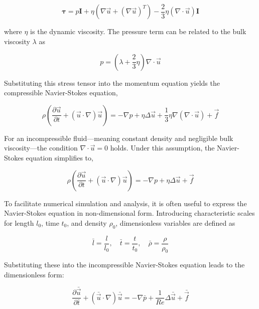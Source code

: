 \begin{equation}
    \boldsymbol{\tau} = p\mathbf{I} + \eta\left( \nabla \vec{u} + (\nabla \vec{u})^T \right) - \frac{2}{3}\eta(\nabla \cdot \vec{u})\mathbf{I}
\end{equation}

where $\eta$ is the dynamic viscosity. The pressure term can be related to the bulk viscosity $\lambda$ as

\begin{equation}
    p = \left( \lambda + \frac{2}{3}\eta \right) \nabla \cdot \vec{u}
\end{equation}

Substituting this stress tensor into the momentum equation yields the compressible Navier-Stokes equation,

\begin{equation}
    \rho \left(\frac{\partial\vec{u}}{\partial t} + (\vec{u}\cdot\nabla)\vec{u} \right) = -\nabla p + \eta \Delta \vec{u} + \frac{1}{3}\eta \nabla(\nabla \cdot \vec{u}) + \vec{f}
\end{equation}

For an incompressible fluid—meaning constant density and negligible bulk viscosity—the condition $\nabla \cdot \vec{u} = 0$ holds. Under this assumption, the Navier-Stokes equation simplifies to,

\begin{equation}
    \rho \left(\frac{\partial\vec{u}}{\partial t} + (\vec{u}\cdot\nabla)\vec{u} \right) = -\nabla p + \eta \Delta \vec{u} + \vec{f}
\end{equation}

To facilitate numerical simulation and analysis, it is often useful to express the Navier-Stokes equation in non-dimensional form. Introducing characteristic scales for length 
$l_0$, time $t_0$, and density $\rho_0$, dimensionless variables are defined as

\begin{equation}
    \bar{l} = \frac{l}{l_0}, \quad \bar{t} = \frac{t}{t_0}, \quad \bar{\rho} = \frac{\rho}{\rho_0}
\end{equation}

Substituting these into the incompressible Navier-Stokes equation leads to the dimensionless form:

\begin{equation}
    \frac{\partial \bar{\vec{u}}}{\partial \bar{t}} + (\bar{\vec{u}} \cdot\nabla)\bar{\vec{u}} = -\nabla \bar{p} + \frac{1}{Re} \Delta \bar{\vec{u}} + \bar{\vec{f}}    
\end{equation}

